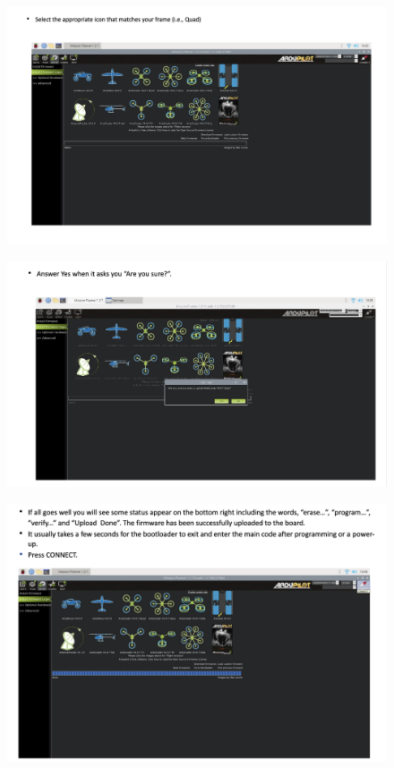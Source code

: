 \begin{figure}[h!]
\centering
\includegraphics[width=\columnwidth]{./Figures/config_img22.png}
\end{figure}

\begin{figure}[h!]
\centering
\includegraphics[width=\columnwidth]{./Figures/config_img23.png}
\end{figure}

\begin{figure}[h!]
\centering
\includegraphics[width=\columnwidth]{./Figures/config_img24.png}
\end{figure}


